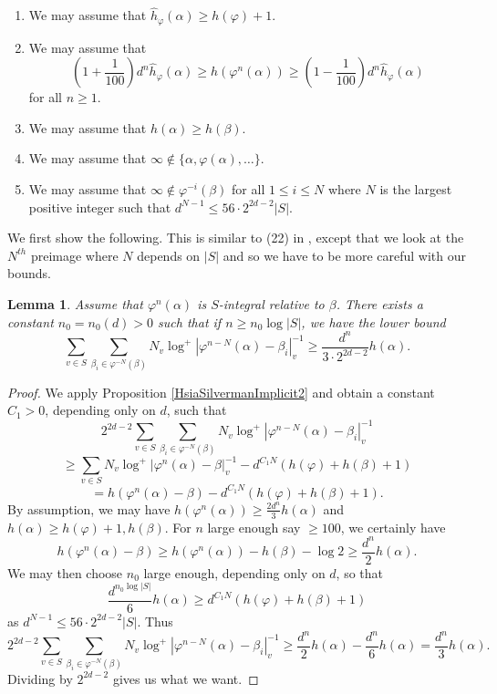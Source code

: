 \documentclass[10pt, reqno]{amsart}
\newcommand{\vphi}{\varphi}
\newcommand{\h}{\widehat{h}}
\numberwithin{theorem}{section}
\newtheorem{lemma}[theorem]{Lemma}
\numberwithin{equation}{section}
\numberwithin{example}{section}
\numberwithin{definition}{section}
\begin{document}
\begin{enumerate}
\item We may assume that $\h_{\vphi}(\alpha) \geq h(\vphi) + 1$.

\item We may assume that 
$$\left(1+ \frac{1}{100} \right) d^n \h_{\vphi}(\alpha) \geq h(\vphi^n(\alpha)) \geq \left(1 - \frac{1}{100} \right) d^n \h_{\vphi}(\alpha)$$
for all $n \geq 1$. 

\item We may assume that $h(\alpha) \geq h(\beta)$.

\item We may assume that $\infty \not \in \{\alpha,\vphi(\alpha),\ldots\}$. 

\item We may assume that $\infty \not \in \vphi^{-i}(\beta)$ for all $1 \leq i \leq N$ where $N$ is the largest positive integer such that $d^{N-1} \leq 56 \cdot 2^{2d-2} |S|$.
\end{enumerate}


We first show the following. This is similar to (22) in \cite{HS11}, except that we look at the $N^{th}$ preimage where $N$ depends on $|S|$ and so we have to be more careful with our bounds. 

\begin{lemma} \label{SIntegralBound1}
Assume that $\vphi^n(\alpha)$ is $S$-integral relative to $\beta$. There exists a constant $n_0 = n_0(d) > 0$ such that if $n \geq n_0 \log |S|$, we have the lower bound
$$\sum_{v \in S} \sum_{\beta_i \in \vphi^{-N}(\beta)} N_v \log^+|\vphi^{n-N}(\alpha)-\beta_i|_v^{-1} \geq \frac{d^{n}}{3 \cdot 2^{2d-2}} h(\alpha).$$
\end{lemma}

\begin{proof}
We apply Proposition \ref{HsiaSilvermanImplicit2} and obtain a constant $C_1 > 0$, depending only on $d$, such that
$$2^{2d-2} \sum_{v \in S} \sum_{\beta_i \in \vphi^{-N}(\beta)} N_v\log^+|\vphi^{n-N}(\alpha)-\beta_i|_v^{-1}$$
$$\geq \sum_{v \in S} N_v \log^+|\vphi^n(\alpha)-\beta|_v^{-1} -  d^{C_1 N } \left( h(\vphi) + h(\beta) + 1 \right)$$
$$= h(\vphi^n(\alpha) - \beta) - d^{C_1 N}(h(\vphi) + h(\beta)+1).$$
By assumption, we may have $h(\vphi^n(\alpha)) \geq \frac{2d^n}{3}h(\alpha)$ and $h(\alpha) \geq h(\vphi)+1,h(\beta)$. For $n$ large enough say $\geq 100$, we certainly have 
$$h(\vphi^n(\alpha) - \beta) \geq h(\vphi^n(\alpha)) - h(\beta) - \log 2 \geq \frac{d^n}{2} h(\alpha).$$
We may then choose $n_0$ large enough, depending only on $d$, so that 
$$\frac{d^{n_0 \log |S|}}{6} h(\alpha) \geq d^{C_1 N}(h(\vphi)+h(\beta)+1)$$
as $d^{N-1} \leq 56 \cdot 2^{2d-2} |S|$. Thus 
$$2^{2d-2} \sum_{v \in S} \sum_{\beta_i \in \vphi^{-N}(\beta)} N_v \log^+|\vphi^{n-N}(\alpha) - \beta_i|^{-1}_v \geq \frac{d^n}{2} h(\alpha) - \frac{d^n}{6}h(\alpha) = \frac{d^n}{3}h(\alpha).$$
Dividing by $2^{2d-2}$ gives us what we want.
\end{proof}
\end{document}
